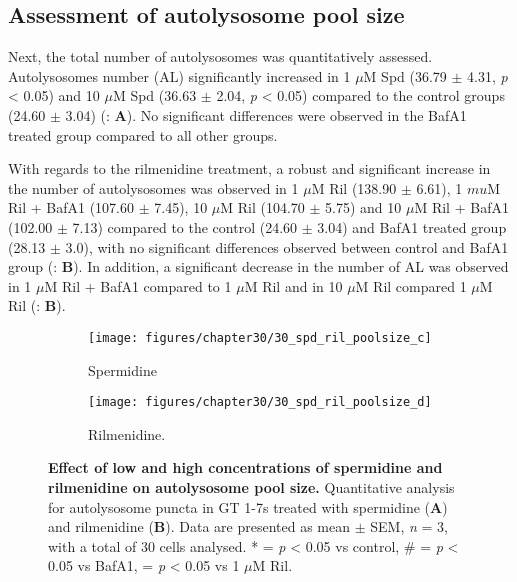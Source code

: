 \subsection{Assessment of autolysosome pool size}
Next, the total number of autolysosomes was quantitatively assessed.  Autolysosomes number (AL) significantly increased in 1 $\mu$M Spd (36.79 $\pm$ 4.31, \textit{p} < 0.05) and 10 $\mu$M Spd (36.63 $\pm$ 2.04, \textit{p} < 0.05) compared to the control groups (24.60 $\pm$ 3.04) (: \textbf{A}). No significant differences were observed in the BafA1 treated group compared to all other groups.

With regards to the rilmenidine treatment, a robust and significant increase in the number of autolysosomes was observed in 1 $\mu$M Ril (138.90 $\pm$ 6.61), 1 $mu$M Ril + BafA1 (107.60 $\pm$ 7.45), 10 $\mu$M Ril (104.70 $\pm$ 5.75) and 10 $\mu$M Ril + BafA1 (102.00 $\pm$ 7.13) compared to the control (24.60 $\pm$ 3.04) and BafA1 treated group (28.13 $\pm$ 3.0), with no significant differences observed between control and BafA1 group (: \textbf{B}). In addition, a significant decrease in the number of AL was observed in 1 $\mu$M Ril + BafA1 compared to 1 $\mu$M Ril and in 10 $\mu$M Ril compared 1 $\mu$M Ril (: \textbf{B}).

\begin{figure}[!htbp]
  \begin{subfigure}[b]{0.495\linewidth}
    \texttt{[image: figures/chapter30/30\_spd\_ril\_poolsize\_c]}
    \caption{Spermidine}
  \end{subfigure}
  \begin{subfigure}[b]{0.495\linewidth}
    \texttt{[image: figures/chapter30/30\_spd\_ril\_poolsize\_d]}
    \caption{Rilmenidine.}
  \end{subfigure}
  \caption[Effect of low and high concentrations of spermidine and rilmenidine on autolysosome pool size]{\textbf{Effect of low and high concentrations of spermidine and rilmenidine on autolysosome pool size.} Quantitative analysis for autolysosome puncta in GT 1-7s treated with spermidine (\textbf{A}) and rilmenidine (\textbf{B}). Data are presented as mean $\pm$ SEM, \textit{n} = 3, with a total of 30 cells analysed. * = \textit{p} < 0.05 vs control, \# = \textit{p} < 0.05 vs BafA1, \@ = \textit{p} < 0.05 vs 1 $\mu$M Ril.}
  \label{fig:30_spd_ril_poolsize2}
\end{figure}

